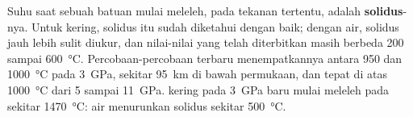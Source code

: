 Suhu saat sebuah batuan mulai meleleh, pada tekanan tertentu, adalah
\textbf{solidus}-nya. Untuk  kering, solidus itu sudah diketahui dengan
baik; dengan air, solidus jauh lebih sulit diukur, dan nilai-nilai yang telah
diterbitkan masih berbeda 200 sampai \qty{600}{\celsius}. Percobaan-percobaan
terbaru menempatkannya antara 950 dan \qty{1000}{\celsius} pada \qty{3}{GPa},
sekitar \qty{95}{km} di bawah permukaan, dan tepat di atas \qty{1000}{\celsius}
dari 5 sampai \qty{11}{GPa}.  kering pada \qty{3}{GPa} baru mulai
meleleh pada sekitar \qty{1470}{\celsius}: air menurunkan solidus sekitar
\qty{500}{\celsius}.

